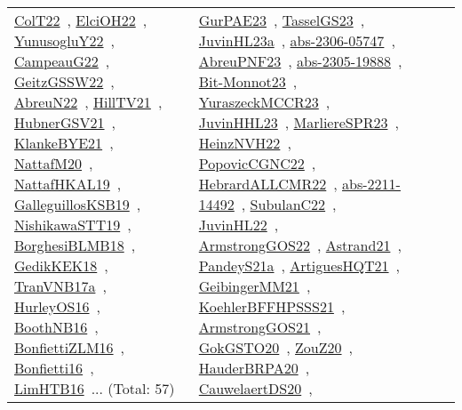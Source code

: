 {\begin{longtable}{lp{3cm}>{\raggedright\arraybackslash}p{6cm}>{\raggedright\arraybackslash}p{6cm}>{\raggedright\arraybackslash}p{8cm}}
\href{../works/ColT22.pdf}{ColT22}~\cite{ColT22}, \href{../works/ElciOH22.pdf}{ElciOH22}~\cite{ElciOH22}, \href{../works/YunusogluY22.pdf}{YunusogluY22}~\cite{YunusogluY22}, \href{../works/CampeauG22.pdf}{CampeauG22}~\cite{CampeauG22}, \href{../works/GeitzGSSW22.pdf}{GeitzGSSW22}~\cite{GeitzGSSW22}, \href{../works/AbreuN22.pdf}{AbreuN22}~\cite{AbreuN22}, \href{../works/HillTV21.pdf}{HillTV21}~\cite{HillTV21}, \href{../works/HubnerGSV21.pdf}{HubnerGSV21}~\cite{HubnerGSV21}, \href{../works/KlankeBYE21.pdf}{KlankeBYE21}~\cite{KlankeBYE21}, \href{../works/NattafM20.pdf}{NattafM20}~\cite{NattafM20}, \href{../works/NattafHKAL19.pdf}{NattafHKAL19}~\cite{NattafHKAL19}, \href{../works/GalleguillosKSB19.pdf}{GalleguillosKSB19}~\cite{GalleguillosKSB19}, \href{../works/NishikawaSTT19.pdf}{NishikawaSTT19}~\cite{NishikawaSTT19}, \href{../works/BorghesiBLMB18.pdf}{BorghesiBLMB18}~\cite{BorghesiBLMB18}, \href{../works/GedikKEK18.pdf}{GedikKEK18}~\cite{GedikKEK18}, \href{../works/TranVNB17a.pdf}{TranVNB17a}~\cite{TranVNB17a}, \href{../works/HurleyOS16.pdf}{HurleyOS16}~\cite{HurleyOS16}, \href{../works/BoothNB16.pdf}{BoothNB16}~\cite{BoothNB16}, \href{../works/BonfiettiZLM16.pdf}{BonfiettiZLM16}~\cite{BonfiettiZLM16}, \href{../works/Bonfietti16.pdf}{Bonfietti16}~\cite{Bonfietti16}, \href{../works/LimHTB16.pdf}{LimHTB16}~\cite{LimHTB16}... (Total: 57) & \href{../works/GurPAE23.pdf}{GurPAE23}~\cite{GurPAE23}, \href{../works/TasselGS23.pdf}{TasselGS23}~\cite{TasselGS23}, \href{../works/JuvinHL23a.pdf}{JuvinHL23a}~\cite{JuvinHL23a}, \href{../works/abs-2306-05747.pdf}{abs-2306-05747}~\cite{abs-2306-05747}, \href{../works/AbreuPNF23.pdf}{AbreuPNF23}~\cite{AbreuPNF23}, \href{../works/abs-2305-19888.pdf}{abs-2305-19888}~\cite{abs-2305-19888}, \href{../works/Bit-Monnot23.pdf}{Bit-Monnot23}~\cite{Bit-Monnot23}, \href{../works/YuraszeckMCCR23.pdf}{YuraszeckMCCR23}~\cite{YuraszeckMCCR23}, \href{../works/JuvinHHL23.pdf}{JuvinHHL23}~\cite{JuvinHHL23}, \href{../works/MarliereSPR23.pdf}{MarliereSPR23}~\cite{MarliereSPR23}, \href{../works/HeinzNVH22.pdf}{HeinzNVH22}~\cite{HeinzNVH22}, \href{../works/PopovicCGNC22.pdf}{PopovicCGNC22}~\cite{PopovicCGNC22}, \href{../works/HebrardALLCMR22.pdf}{HebrardALLCMR22}~\cite{HebrardALLCMR22}, \href{../works/abs-2211-14492.pdf}{abs-2211-14492}~\cite{abs-2211-14492}, \href{../works/SubulanC22.pdf}{SubulanC22}~\cite{SubulanC22}, \href{../works/JuvinHL22.pdf}{JuvinHL22}~\cite{JuvinHL22}, \href{../works/ArmstrongGOS22.pdf}{ArmstrongGOS22}~\cite{ArmstrongGOS22}, \href{../works/Astrand21.pdf}{Astrand21}~\cite{Astrand21}, \href{../works/PandeyS21a.pdf}{PandeyS21a}~\cite{PandeyS21a}, \href{../works/ArtiguesHQT21.pdf}{ArtiguesHQT21}~\cite{ArtiguesHQT21}, \href{../works/GeibingerMM21.pdf}{GeibingerMM21}~\cite{GeibingerMM21}, \href{../works/KoehlerBFFHPSSS21.pdf}{KoehlerBFFHPSSS21}~\cite{KoehlerBFFHPSSS21}, \href{../works/ArmstrongGOS21.pdf}{ArmstrongGOS21}~\cite{ArmstrongGOS21}, \href{../works/GokGSTO20.pdf}{GokGSTO20}~\cite{GokGSTO20}, \href{../works/ZouZ20.pdf}{ZouZ20}~\cite{ZouZ20}, \href{../works/HauderBRPA20.pdf}{HauderBRPA20}~\cite{HauderBRPA20}, \href{../works/CauwelaertDS20.pdf}{CauwelaertDS20}~\cite{CauwelaertDS20}, 
\end{longtable}}

